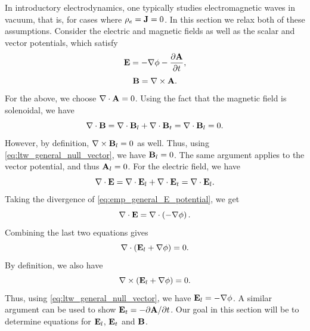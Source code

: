\documentclass[a4paper,11pt]{report}
\begin{document}
\label{sec:electromagnetic_waves_plasmas}
In introductory electrodynamics, one typically studies electromagnetic waves in vacuum, that is, for cases where $\rho_e = \mathbf{J} = 0$. In this section we relax both of these assumptions. Consider the electric and magnetic fields as well as the scalar and vector potentials, which satisfy
\begin{equation}
    \label{eq:emp_general_E_potential}
    \mathbf{E} = -\nabla \phi - \frac{\partial \mathbf{A}}{\partial t},
\end{equation}
\begin{equation}
    \label{eq:emp_general_B_potential}
    \mathbf{B} = \nabla \times \mathbf{A}.
\end{equation}
For the above, we choose $\nabla \cdot \mathbf{A} = 0$. Using the fact that the magnetic field is solenoidal, we have
\begin{equation*}
    \nabla \cdot \mathbf{B} = \nabla \cdot \mathbf{B}_l + \nabla \cdot \mathbf{B}_t = \nabla \cdot \mathbf{B}_l = 0.
\end{equation*}
However, by definition, $\nabla \times \mathbf{B}_l = 0$ as well. Thus, using \cref{eq:ltw_general_null_vector}, we have $\mathbf{B}_l = 0$. The same argument applies to the vector potential, and thus $\mathbf{A}_l = 0$. For the electric field, we have
\begin{equation*}
    \nabla \cdot \mathbf{E} = \nabla \cdot \mathbf{E}_l + \nabla \cdot \mathbf{E}_t = \nabla \cdot \mathbf{E}_l .
\end{equation*}
Taking the divergence of \cref{eq:emp_general_E_potential}, we get
\begin{equation}
    \nabla \cdot \mathbf{E} = \nabla \cdot \left ( -\nabla \phi \right ).
\end{equation}
Combining the last two equations gives
\begin{equation*}
    \nabla \cdot \left ( \mathbf{E}_l + \nabla \phi \right ) = 0.
\end{equation*}
By definition, we also have
\begin{equation*}
    \nabla \times \left ( \mathbf{E}_l + \nabla \phi \right ) = 0.
\end{equation*}
Thus, using \cref{eq:ltw_general_null_vector}, we have $\mathbf{E}_l = -\nabla \phi$. A similar argument can be used to show $\mathbf{E}_t = -\partial \mathbf{A} / \partial t$. Our goal in this section will be to determine equations for $\mathbf{E}_l$, $\mathbf{E}_t$ and $\mathbf{B}$.
\end{document}
